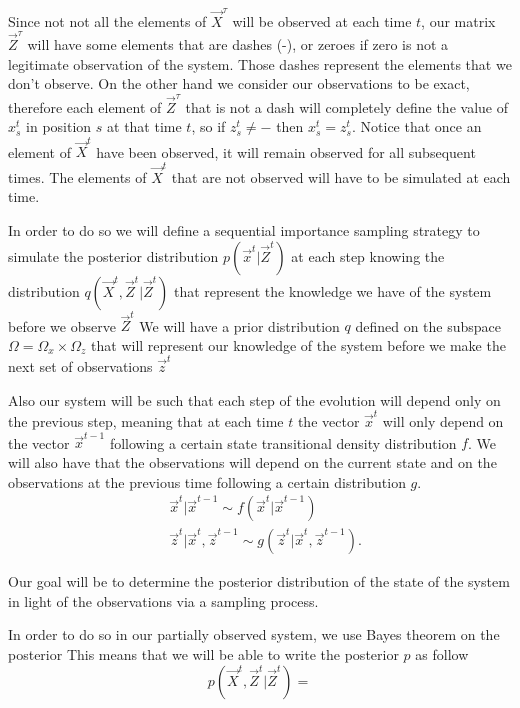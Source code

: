 Since not not all the elements of $\vec{X}^{\tau}$ will be observed at each time $t$, our matrix $\vec{Z}^{\tau}$ will have some elements that are dashes (-), or zeroes if zero is not a legitimate observation of the system. Those dashes represent the elements that we don't observe. On the other hand we consider our observations to be exact, therefore each element of $\vec{Z}^{\tau}$ that is not a dash will completely define the value of $x^t_s$ in position $s$ at that time $t$, so if $z^t_s \neq -$ then $x^t_s = z^t_s$. Notice that once an element of $\vec{X}^t$ have been observed, it will remain observed for all subsequent times. The elements of $\vec{X}^t$ that are not observed will have to be simulated at each time.

In order to do so we will define a sequential importance sampling strategy to simulate the posterior distribution $p(\vec{x}^t | \vec{Z}^t)$ at each step knowing the distribution $q(\vec{X}^t, \vec{Z}^t | \vec{Z}^t)$ that represent the knowledge we have of the system before we observe $\vec{Z}^t$
We will have a prior distribution $q$ defined on the subspace $\Omega = \Omega_x \times \Omega_z$ that will represent our knowledge of the system before we make the next set of observations $\vec{z}^t$

Also our system will be such that each step of the evolution will depend only on the previous step, meaning that at each time $t$ the vector $\vec{x}^t$ will only depend on the vector $\vec{x}^{t-1}$ following a certain state transitional density distribution $f$. We will also have that the observations will depend on the current state and on the observations at the previous time following a certain distribution $g$.
\begin{align*}
    &\vec{x}^t | \vec{x}^{t-1} \sim f(\vec{x}^t | \vec{x}^{t-1})\\
    &\vec{z}^t | \vec{x}^t, \vec{z}^{t-1} \sim g(\vec{z}^t | \vec{x}^t, \vec{z}^{t-1}).
\end{align*}

Our goal will be to determine the posterior distribution of the state of the system in light of the observations via a sampling process.

In order to do so in our partially observed system, we use Bayes theorem on the posterior
This means that we will be able to write the posterior $p$ as follow
\begin{equation*}
    p(\vec{X}^t, \vec{Z}^t | \vec{Z}^t) =
\end{equation*}

